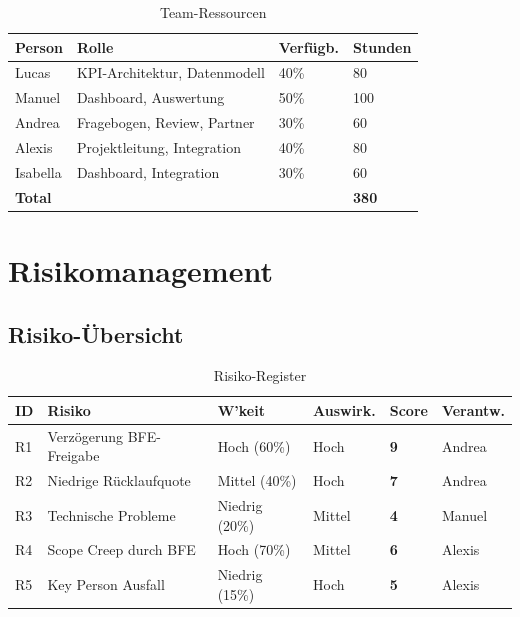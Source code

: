 \documentclass[11pt,a4paper]{article}
\begin{document}
\begin{table}[h]
\centering
{}
\begin{tabular}{L{3cm}L{5cm}C{2cm}C{2cm}}
\toprule
\textbf{Person} & \textbf{Rolle} & \textbf{Verfügb.} & \textbf{Stunden} \\
\midrule
Lucas & KPI-Architektur, Datenmodell & 40\% & 80 \\
Manuel & Dashboard, Auswertung & 50\% & 100 \\
Andrea & Fragebogen, Review, Partner & 30\% & 60 \\
Alexis & Projektleitung, Integration & 40\% & 80 \\
Isabella & Dashboard, Integration & 30\% & 60 \\
\midrule
\textbf{Total} & & & \textbf{380} \\
\bottomrule
\end{tabular}
\caption{Team-Ressourcen}
\end{table}

\newpage

\section{Risikomanagement}

\subsection{Risiko-Übersicht}

\begin{table}[h]
\centering
{}
\begin{tabular}{C{0.8cm}L{4cm}C{1.8cm}C{1.8cm}C{1.5cm}L{2.5cm}}
\toprule
\textbf{ID} & \textbf{Risiko} & \textbf{W'keit} & \textbf{Auswirk.} & \textbf{Score} & \textbf{Verantw.} \\
\midrule
R1 & Verzögerung BFE-Freigabe & Hoch (60\%) & Hoch & \textcolor{fared}{\textbf{9}} & Andrea \\
R2 & Niedrige Rücklaufquote & Mittel (40\%) & Hoch & \textcolor{faorange}{\textbf{7}} & Andrea \\
R3 & Technische Probleme & Niedrig (20\%) & Mittel & \textcolor{fagreen}{\textbf{4}} & Manuel \\
R4 & Scope Creep durch BFE & Hoch (70\%) & Mittel & \textcolor{faorange}{\textbf{6}} & Alexis \\
R5 & Key Person Ausfall & Niedrig (15\%) & Hoch & \textcolor{fagreen}{\textbf{5}} & Alexis \\
\bottomrule
\end{tabular}
\caption{Risiko-Register}
\end{table}
\end{document}
